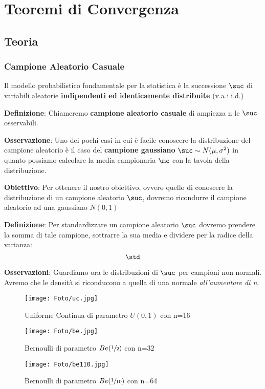 
\chapter{Teoremi di Convergenza}

\section{Teoria}

\subsection{Campione Aleatorio Casuale}

Il modello probabilistico fondamentale per la statistica è la successione $\suc$ di variabili aleatorie \textbf{indipendenti ed identicamente distribuite} (v.a i.i.d.) \n

\ind \textbf{Definizione}: Chiameremo \textbf{campione aleatorio casuale} di ampiezza n le $\suc$ osservabili. \n 

\ind \textbf{Osservazione}: Uno dei pochi casi in cui è facile conoscere la distribuzione del campione aleatorio è il caso del \textbf{campione gaussiano} $\suc \sim N(\mu, \sigma^2)$ in quanto possiamo calcolare la media campionaria $\mc $ con la tavola della distribuzione. \n

\ind \textbf{Obiettivo}: Per ottenere il nostro obiettivo, ovvero quello di conoscere la distribuzione di un campione aleatorio $\suc$, dovremo ricondurre il campione aleatorio ad una gaussiano $N(0,1)$ \n

\ind \textbf{Definizione}: Per standardizzare un campione aleatorio $\suc$ dovremo prendere la somma di tale campione, sottrarre la sua media e dividere per la radice della varianza: $$\std$$

\newpage
\ind \textbf{Osservazioni}: Guardiamo ora le distribuzioni di $\suc $ per campioni non normali. Avremo che le densità si riconducono a quella di una normale \textit{all'aumentare di n}.\n
\begin{figure}[h!]
    \centering
    \texttt{[image: Foto/uc.jpg]}
    \color{gray}
    \caption{Uniforme Continua di parametro $U(0,1)$ con n=16}
    \texttt{[image: Foto/be.jpg]}
    \color{gray}
    \caption{Bernoulli di parametro $Be(\sfrac{1}{2})$ con n=32}
    \texttt{[image: Foto/be110.jpg]}
    \color{gray}
    \caption{Bernoulli di parametro $Be(\sfrac{1}{10})$ con n=64}
\end{figure}

